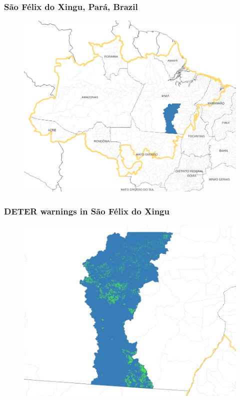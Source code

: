 \documentclass[aspectratio=169]{beamer}
\begin{document}
\begin{frame}
    \frametitle{São Félix do Xingu, Pará, Brazil}
    \begin{figure}[h] 
        \includegraphics[width=0.65\linewidth]
        {./figures/sao_felix_do_xingu.png}
        \label{fig:sao_felix_do_xingu}
    \end{figure}
\end{frame}

\begin{frame}
    \frametitle{DETER warnings in São Félix do Xingu}
    \begin{figure}[h] 
        \includegraphics[width=0.65\linewidth]
        {./figures/deter_sao_felix_do_xingu.png}
        \label{fig:sao_felix_do_xingu}
    \end{figure}
\end{frame}
\end{document}
